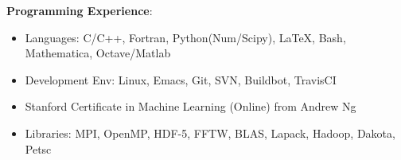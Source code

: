 \blankline

\textbf{Programming Experience}: 
 \begin{itemize}
  \itemsep 0pt
  \item Languages: C/C++, Fortran, Python(Num/Scipy), \LaTeX{}, Bash, Mathematica, Octave/Matlab
  \item Development Env: Linux, Emacs, Git, SVN, Buildbot, TravisCI
  \item Stanford Certificate in Machine Learning (Online) from Andrew Ng
  \item Libraries: MPI, OpenMP, HDF-5, FFTW, BLAS, Lapack, Hadoop,
	Dakota, Petsc
 \end{itemize}

